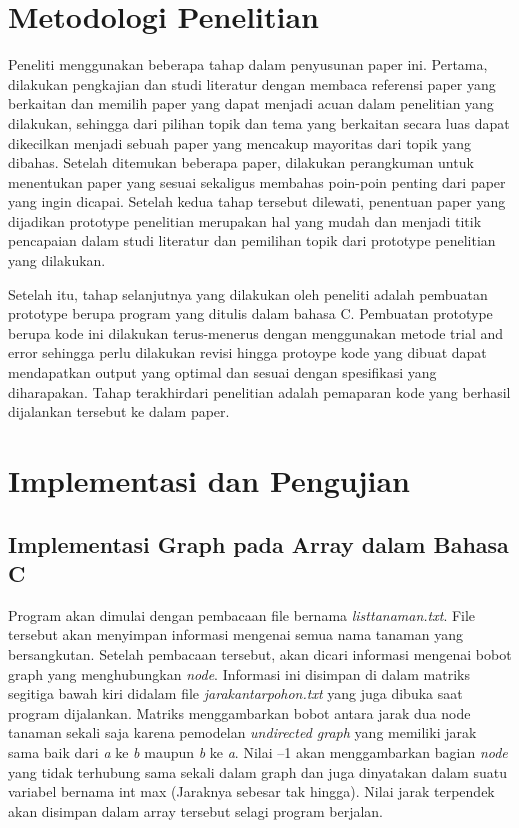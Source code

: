 \documentclass[conference]{IEEEtran}
\begin{document}
\section{Metodologi Penelitian}
Peneliti menggunakan beberapa tahap dalam penyusunan paper ini. Pertama, dilakukan pengkajian dan studi literatur dengan membaca referensi paper yang berkaitan dan memilih paper yang dapat menjadi acuan dalam penelitian yang dilakukan, sehingga dari pilihan topik dan tema yang berkaitan secara luas dapat dikecilkan menjadi sebuah paper yang mencakup mayoritas dari topik yang dibahas. Setelah ditemukan beberapa paper, dilakukan perangkuman untuk menentukan paper yang sesuai sekaligus membahas poin-poin penting dari paper yang ingin dicapai. Setelah kedua tahap tersebut dilewati, penentuan paper yang dijadikan prototype penelitian merupakan hal yang mudah dan menjadi titik pencapaian dalam studi literatur dan pemilihan topik dari prototype penelitian yang dilakukan.

Setelah itu, tahap selanjutnya yang dilakukan oleh peneliti adalah pembuatan prototype berupa program yang ditulis dalam bahasa C. Pembuatan prototype berupa kode ini dilakukan terus-menerus dengan menggunakan metode trial and error sehingga perlu dilakukan revisi hingga protoype kode yang dibuat dapat mendapatkan output yang optimal dan sesuai dengan spesiﬁkasi yang diharapakan. Tahap terakhirdari penelitian adalah pemaparan kode yang berhasil dijalankan tersebut ke dalam paper.

\begin{figure}[htbp]
	\centering
	\scalebox{0.26}{}
\end{figure} 

\section{Implementasi dan Pengujian}
\subsection{Implementasi Graph pada Array dalam Bahasa C}
Program akan dimulai dengan pembacaan ﬁle bernama \textit{listtanaman.txt}. File tersebut akan menyimpan informasi mengenai semua nama tanaman yang bersangkutan. Setelah pembacaan tersebut, akan dicari informasi mengenai bobot graph yang menghubungkan \textit{node}. Informasi ini disimpan di dalam matriks segitiga bawah kiri didalam ﬁle \textit{jarakantarpohon.txt} yang juga dibuka saat program dijalankan. Matriks menggambarkan bobot antara jarak dua node tanaman sekali saja karena pemodelan \textit{undirected graph} yang memiliki jarak sama baik dari \textit{a} ke \textit{b} maupun \textit{b} ke \textit{a}. Nilai --1 akan menggambarkan bagian \textit{node} yang tidak terhubung sama sekali dalam graph dan juga dinyatakan dalam suatu variabel bernama int max (Jaraknya sebesar tak hingga). Nilai jarak terpendek akan disimpan dalam array tersebut selagi program berjalan. 
\end{document}
